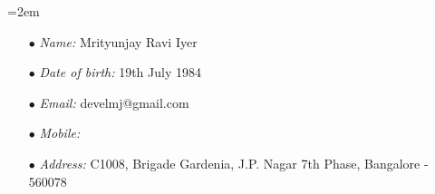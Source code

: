\documentclass{scrartcl}
\newcommand{\Description}[1]{\hangindent=2em\hangafter=0\noindent\raggedright\footnotesize{#1}\par\normalsize}
\begin{document}
\begin{cv}{
\href{http://www.develmj.com}{}
}
\vspace{1em}

\noindent{}
\vspace{0.5em}

\Description{
\begin{itemize}
  \item[\footnotesize$\bullet$] \textsl{Name:} Mrityunjay Ravi Iyer
  \item[\footnotesize$\bullet$] \textsl{Date of birth:} 19th July 1984
  \item[\footnotesize$\bullet$] \textsl{Email:} develmj@gmail.com
  \item[\footnotesize$\bullet$] \textsl{Mobile:} 
  \item[\footnotesize$\bullet$] \textsl{Address:} C1008, Brigade
    Gardenia, J.P. Nagar 7th Phase, Bangalore - 560078
\end{itemize}
}
\end{cv}
\end{document}
